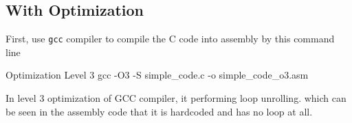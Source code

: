\documentclass[12pt, a4paper]{article}
\begin{document}
    \pagebreak

        \subsection{With Optimization}
            First, use \texttt{gcc} compiler to compile the C code into assembly by this command line
            \begin{codeblock}[minted language=bat]{Optimization Level 3}
                gcc -O3 -S simple_code.c -o simple_code_o3.asm
            \end{codeblock}

            In level 3 optimization of GCC compiler, it performing loop unrolling.
            which can be seen in the assembly code that it is hardcoded and
            has no loop at all.

            \vspace{1em}
\end{document}
